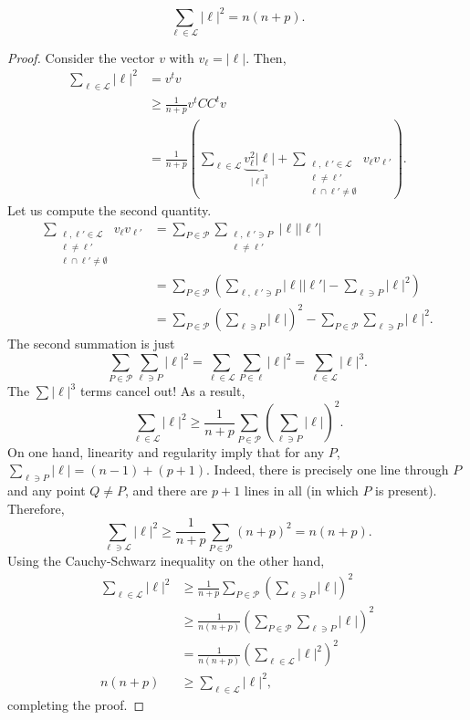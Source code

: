 \documentclass{article}
\begin{document}
		\begin{fprop}
			\[ \sum_{\ell \in \mathcal{L}} |\ell|^2 = n(n+p). \]
		\end{fprop}
		\begin{proof}
			Consider the vector $v$ with $v_{\ell} = |\ell|$. Then,
			\begin{align*}
				\sum_{\ell \in \mathcal{L}} |\ell|^2 &= v^t v \\
					&\ge \frac{1}{n+p} v^t CC^t v \\
					&= \frac{1}{n+p} \left( \sum_{\ell \in \mathcal{L}} \underbrace{v_\ell^2 |\ell|}_{|\ell|^3} + \sum_{\substack{\ell,\ell' \in \mathcal{L} \\ \ell \ne \ell' \\ \ell \cap \ell' \ne \emptyset}} v_{\ell} v_{\ell'}  \right).
			\end{align*}
			Let us compute the second quantity.
			\begin{align*}
				\sum_{\substack{\ell,\ell' \in \mathcal{L} \\ \ell \ne \ell' \\ \ell \cap \ell' \ne \emptyset}} v_{\ell} v_{\ell'} &= \sum_{P \in \mathcal{P}} \sum_{\substack{\ell,\ell' \ni P \\ \ell \ne \ell'}} |\ell||\ell'| \\
					&= \sum_{P \in \mathcal{P}} \left(\sum_{\ell,\ell' \ni P} |\ell||\ell'| - \sum_{\ell \ni P} |\ell|^2\right) \\
					&= \sum_{P \in \mathcal{P}} \left(\sum_{\ell \ni P} |\ell|\right)^2 - \sum_{P \in \mathcal{P}} \sum_{\ell \ni P} |\ell|^2 .
			\end{align*}
			The second summation is just
			\[ \sum_{P \in \mathcal{P}} \sum_{\ell \ni P} |\ell|^2 = \sum_{\ell \in \mathcal{L}} \sum_{P \in \ell} |\ell|^2 = \sum_{\ell \in \mathcal{L}} |\ell|^3. \]
			The $\sum|\ell|^3$ terms cancel out! As a result,
			\[ \sum_{\ell \in \mathcal{L}} |\ell|^2 \ge \frac{1}{n+p} \sum_{P \in \mathcal{P}} \left(\sum_{\ell \ni P} |\ell|\right)^2. \]
			On one hand, linearity and regularity imply that for any $P$, $\sum_{\ell \ni P} |\ell| = (n-1) + (p+1)$. Indeed, there is precisely one line through $P$ and any point $Q \ne P$, and there are $p+1$ lines in all (in which $P$ is present). Therefore,
			\[ \sum_{\ell \ni \mathcal{L}} |\ell|^2 \ge \frac{1}{n+p} \sum_{P \in \mathcal{P}} (n+p)^2 = n(n+p). \]
			Using the Cauchy-Schwarz inequality on the other hand,
			\begin{align*}
			 	\sum_{\ell \in \mathcal{L}} |\ell|^2 &\ge \frac{1}{n+p} \sum_{P \in \mathcal{P}} \left(\sum_{\ell \ni P} |\ell|\right)^2 \\
			 		&\ge \frac{1}{n(n+p)} \left(\sum_{P \in \mathcal{P}} \sum_{\ell \ni P} |\ell|\right)^2 \\
			 		&= \frac{1}{n(n+p)} \left(\sum_{\ell \in \mathcal{L}} |\ell|^2\right)^2 \\
			 	n(n+p) &\ge \sum_{\ell \in \mathcal{L}} |\ell|^2,
			\end{align*}
			completing the proof.
		\end{proof}
\end{document}

